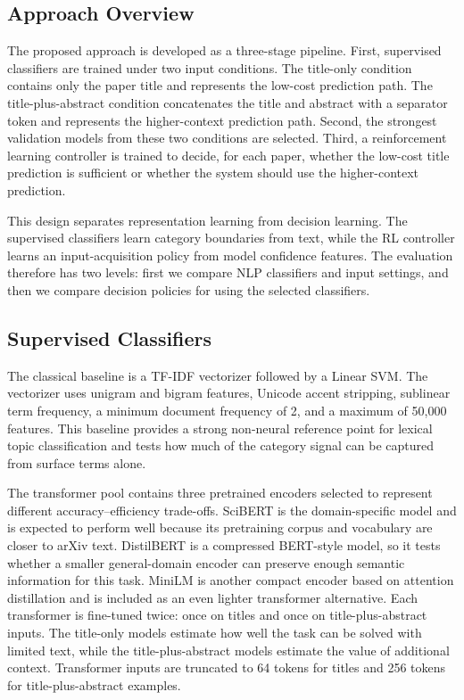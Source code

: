 \documentclass{article}
\begin{document}
\subsection{Approach Overview}

The proposed approach is developed as a three-stage pipeline. First, supervised classifiers are trained under two input conditions. The title-only condition contains only the paper title and represents the low-cost prediction path. The title-plus-abstract condition concatenates the title and abstract with a separator token and represents the higher-context prediction path. Second, the strongest validation models from these two conditions are selected. Third, a reinforcement learning controller is trained to decide, for each paper, whether the low-cost title prediction is sufficient or whether the system should use the higher-context prediction.

This design separates representation learning from decision learning. The supervised classifiers learn category boundaries from text, while the RL controller learns an input-acquisition policy from model confidence features. The evaluation therefore has two levels: first we compare NLP classifiers and input settings, and then we compare decision policies for using the selected classifiers.

\subsection{Supervised Classifiers}

The classical baseline is a TF-IDF vectorizer followed by a Linear SVM. The vectorizer uses unigram and bigram features, Unicode accent stripping, sublinear term frequency, a minimum document frequency of 2, and a maximum of 50,000 features. This baseline provides a strong non-neural reference point for lexical topic classification and tests how much of the category signal can be captured from surface terms alone.

The transformer pool contains three pretrained encoders selected to represent different accuracy--efficiency trade-offs. SciBERT is the domain-specific model and is expected to perform well because its pretraining corpus and vocabulary are closer to arXiv text. DistilBERT is a compressed BERT-style model, so it tests whether a smaller general-domain encoder can preserve enough semantic information for this task. MiniLM is another compact encoder based on attention distillation and is included as an even lighter transformer alternative. Each transformer is fine-tuned twice: once on titles and once on title-plus-abstract inputs. The title-only models estimate how well the task can be solved with limited text, while the title-plus-abstract models estimate the value of additional context. Transformer inputs are truncated to 64 tokens for titles and 256 tokens for title-plus-abstract examples.
\end{document}
